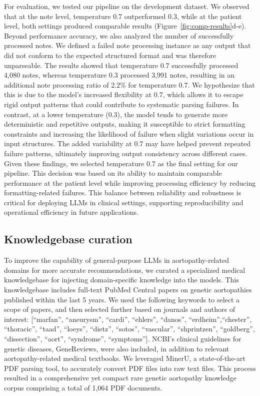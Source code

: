 \documentclass[fleqn,10pt]{wlscirep}
\begin{document}
For evaluation, we tested our pipeline on the development dataset. We observed that at the note level, temperature 0.7 outperformed 0.3, while at the patient level, both settings produced comparable results (Figure~\ref{fig:comp-results}d-e). Beyond performance accuracy, we also analyzed the number of successfully processed notes. We defined a failed note processing instance as any output that did not conform to the expected structured format and was therefore unparseable. The results showed that temperature 0.7 successfully processed 4,080 notes, whereas temperature 0.3 processed 3,991 notes, resulting in an additional note processing ratio of 2.2\% for temperature 0.7. We hypothesize that this is due to the model's increased flexibility at 0.7, which allows it to escape rigid output patterns that could contribute to systematic parsing failures. In contrast, at a lower temperature (0.3), the model tends to generate more deterministic and repetitive outputs, making it susceptible to strict formatting constraints and increasing the likelihood of failure when slight variations occur in input structures. The added variability at 0.7 may have helped prevent repeated failure patterns, ultimately improving output consistency across different cases. Given these findings, we selected temperature 0.7 as the final setting for our pipeline. This decision was based on its ability to maintain comparable performance at the patient level while improving processing efficiency by reducing formatting-related failures. This balance between reliability and robustness is critical for deploying LLMs in clinical settings, supporting reproducibility and operational efficiency in future applications.


\subsection*{Knowledgebase curation}
To improve the capability of general-purpose LLMs in aortopathy-related domains for more accurate recommendations, we curated a specialized medical knowledgebase for injecting domain-specific knowledge into the models. This knowledgebase includes full-text PubMed Central papers on genetic aortopathies published within the last 5 years. We used the following keywords to select a scope of papers, and then selected further based on journals and authors of interest: [``marfan'', ``aneurysm'', ``cardi'', ``ehlers'', ``danos'', ``erdheim'',``chester'', ``thoracic'', ``taad'', ``loeys'', ``dietz'', ``sotos'', ``vascular'', ``shprintzen'', ``goldberg'', ``dissection'', ``aort'', ``syndrome'', ``symptoms'']. NCBI’s clinical guidelines for genetic diseases, GeneReviews, were also included, in addition to relevant aortopathy-related medical textbooks. We leveraged MinerU,\cite{wang2024mineru} a state-of-the-art PDF parsing tool, to accurately convert PDF files into raw text files. This process resulted in a comprehensive yet compact rare genetic aortopathy knowledge corpus comprising a total of 1,064 PDF documents.
\end{document}
